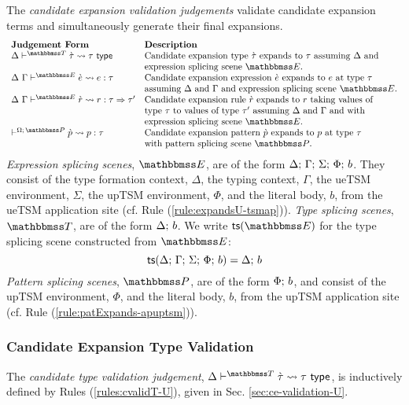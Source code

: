 {{{{The \emph{candidate expansion validation judgements} validate candidate expansion terms and simultaneously generate their final expansions.
\[\begin{array}{ll}
\textbf{Judgement Form} & \textbf{Description}\\
\cvalidT{\Delta}{\tscenev}{\ctau}{\tau} & \text{Candidate expansion type $\ctau$ expands to $\tau$ assuming $\Delta$ and }\\
& \text{expression splicing scene $\escenev$.}\\
\cvalidE{\Delta}{\Gamma}{\escenev}{\ce}{e}{\tau} & \text{Candidate expansion expression $\ce$ expands to $e$ at type $\tau$}\\
& \text{assuming $\Delta$ and $\Gamma$ and expression splicing scene $\escenev$.}\\
\cvalidR{\Delta}{\Gamma}{\escenev}{\crv}{r}{\tau}{\tau'} & \text{Candidate expansion rule $\crv$ expands to $r$ taking values of}\\
& \text{type $\tau$ to values of type $\tau'$ assuming $\Delta$ and $\Gamma$ and with}\\
& \text{expression splicing scene $\escenev$.}\\
\cvalidP{\pctx}{\pscenev}{\cpv}{p}{\tau} & \text{Candidate expansion pattern $\cpv$ expands to $p$ at type $\tau$}\\
& \text{with pattern splicing scene $\pscenev$.}
\end{array}\]
\emph{Expression splicing scenes}, $\escenev$, are of the form $\Delta;\,\Gamma;\,\Sigma;\,\Phi;\,b$. They consist of the type formation context, $\Delta$, the typing context, $\Gamma$, the ueTSM environment, $\Sigma$, the upTSM environment, $\Phi$, and the literal body, $b$, from the ueTSM application site (cf. Rule (\ref{rule:expandsU-tsmap})). \emph{Type splicing scenes}, $\tscenev$, are of the form $\Delta;\,b$. We write $\tsfrom{\escenev}$ for the type splicing scene constructed from $\escenev$:
\[\mathsf{ts}(\Delta;\,\Gamma;\,\Sigma;\,\Phi;\,b) = \Delta;\,b\]
\emph{Pattern splicing scenes}, $\pscenev$, are of the form $\Phi;\,b$, and consist of the upTSM environment, $\Phi$, and the literal body, $b$, from the upTSM application site (cf. Rule (\ref{rule:patExpands-apuptsm})).

\subsubsection{Candidate Expansion Type Validation}
The \emph{candidate type validation judgement}, $\cvalidT{\Delta}{\tscenev}{\ctau}{\tau}$, is inductively defined by Rules (\ref{rules:cvalidT-U}), given in Sec. \ref{sec:ce-validation-U}.

}}}}
